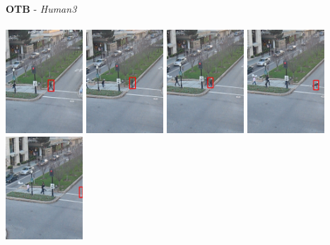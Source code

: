 \documentclass[10pt,twocolumn,letterpaper,french]{article}
\begin{document}
\begin{appendices}
\begin{center}
  \textbf{OTB} - \textit{Human3}\\
  \hspace{1cm}\\
  \includegraphics[width=82pt, cfbox=green 1pt 1pt]{images/exemples/bof/human/000001.png}
  \includegraphics[width=82pt, cfbox=green 1pt 1pt]{images/exemples/bof/human/000008.png}
  \includegraphics[width=82pt, cfbox=red 1pt 1pt]{images/exemples/bof/human/000035.png}
  \includegraphics[width=82pt, cfbox=red 1pt 1pt]{images/exemples/bof/human/000054.png}
  \includegraphics[width=82pt, cfbox=red 1pt 1pt]{images/exemples/bof/human/000086.png}

\end{center}
\end{appendices}
\end{document}
